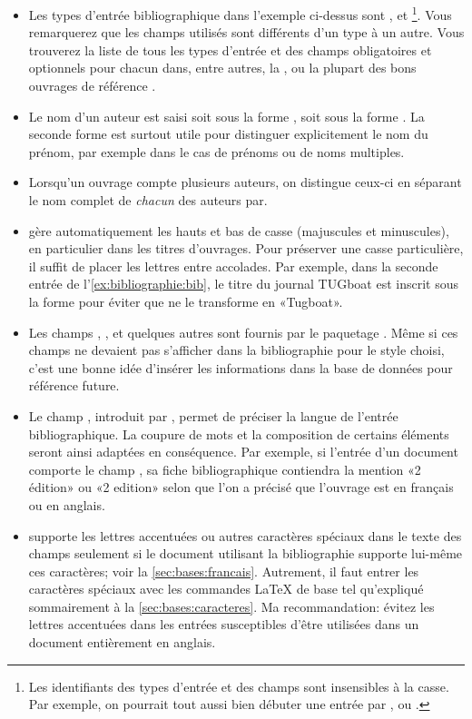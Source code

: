 \begin{itemize}
\item Les types d'entrée bibliographique dans l'exemple ci-dessus sont
  ,  et \footnote{%
    Les identifiants des types d'entrée et des champs sont insensibles
    à la casse. Par exemple, on pourrait tout aussi bien débuter une
    entrée par ,  ou .}. %
  Vous remarquerez que les champs utilisés sont différents d'un type à
  un autre. Vous trouverez la liste de tous les types d'entrée et des champs
  obligatoires et optionnels pour chacun dans, entre autres, la %
  , %
  ou la plupart des bons ouvrages de référence
  \citep[dont][]{Kopka:latex:4e}.
\item Le nom d'un auteur est saisi soit sous la forme , soit sous la forme . La seconde
  forme est surtout utile pour distinguer explicitement le nom du
  prénom, par exemple dans le cas de prénoms ou de noms multiples.
\item Lorsqu'un ouvrage compte plusieurs auteurs, on distingue ceux-ci
  en séparant le nom complet de \emph{chacun} des auteurs par.
\item {\BibTeX} gère automatiquement les hauts et bas de casse
  (majuscules et minuscules), en particulier dans les titres
  d'ouvrages. Pour préserver une casse particulière, il suffit de
  placer les lettres entre accolades. Par exemple, dans la seconde
  entrée de l'\autoref{ex:bibliographie:bib}, le titre du journal
  TUGboat est inscrit sous la forme  pour éviter
  que {\BibTeX} ne le transforme en «Tugboat».
\item Les champs , ,  et quelques
  autres \citep[section~2.8]{natbib} sont fournis par le paquetage
  . Même si ces champs ne devaient pas s'afficher dans la
  bibliographie pour le style choisi, c'est une bonne idée d'insérer
  les informations dans la base de données pour référence future.
\item Le champ , introduit par , permet de
  préciser la langue de l'entrée bibliographique. La coupure de mots
  et la composition de certains éléments seront ainsi adaptées en
  conséquence. Par exemple, si l'entrée d'un document comporte le
  champ , sa fiche bibliographique contiendra la
  mention «2{\ieme} édition» ou «2 edition» selon que l'on a
  précisé que l'ouvrage est en français ou en anglais.
\item {\BibTeX} supporte les lettres accentuées ou autres caractères
  spéciaux dans le texte des champs seulement si le document utilisant
  la bibliographie supporte lui-même ces caractères; voir la
  \autoref{sec:bases:francais}. Autrement, il faut entrer les
  caractères spéciaux avec les commandes {\LaTeX} de base tel
  qu'expliqué sommairement à la \autoref{sec:bases:caracteres}. Ma
  recommandation: évitez les lettres accentuées dans les entrées
  susceptibles d'être utilisées dans un document entièrement en
  anglais.
\end{itemize}

